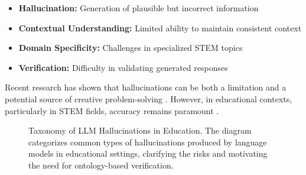 \begin{itemize}
    \item \textbf{Hallucination:} Generation of plausible but incorrect information
    \item \textbf{Contextual Understanding:} Limited ability to maintain consistent context
    \item \textbf{Domain Specificity:} Challenges in specialized STEM topics
    \item \textbf{Verification:} Difficulty in validating generated responses
\end{itemize}

Recent research has shown that hallucinations can be both a limitation and a potential source of creative problem-solving \cite{su2024confabulation}. However, in educational contexts, particularly in STEM fields, accuracy remains paramount \cite{zuo2025medhallbench}.

\begin{figure}[ht]
    \centering
    \caption{Taxonomy of LLM Hallucinations in Education. The diagram categorizes common types of hallucinations produced by language models in educational settings, clarifying the risks and motivating the need for ontology-based verification.}
    \label{fig:llm-hallucination-taxonomy}
\end{figure}

